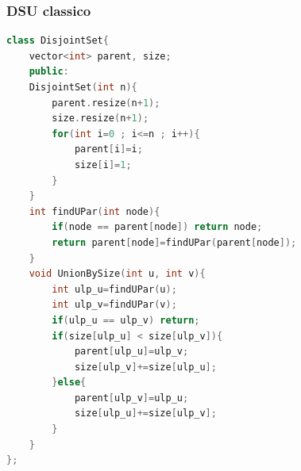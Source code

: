 \subsubsection{DSU classico}
\begin{lstlisting}[style=mystyle, language=C++]
class DisjointSet{
	vector<int> parent, size;
	public:
	DisjointSet(int n){
		parent.resize(n+1);
		size.resize(n+1);
		for(int i=0 ; i<=n ; i++){
			parent[i]=i;
			size[i]=1;
		}
	}
	int findUPar(int node){
		if(node == parent[node]) return node;
		return parent[node]=findUPar(parent[node]);
	}
	void UnionBySize(int u, int v){
		int ulp_u=findUPar(u);
		int ulp_v=findUPar(v);
		if(ulp_u == ulp_v) return;
		if(size[ulp_u] < size[ulp_v]){
			parent[ulp_u]=ulp_v;
			size[ulp_v]+=size[ulp_u];
		}else{
			parent[ulp_v]=ulp_u;
			size[ulp_u]+=size[ulp_v];
		}
	}
};
\end{lstlisting}

